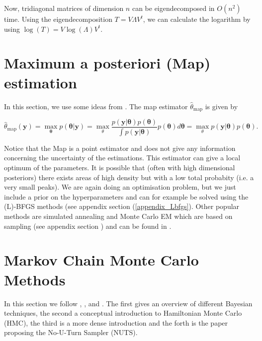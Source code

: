 \documentclass[12pt,a4paper,oneside]{book}
\begin{document}
Now, tridiagonal matrices of dimension $n$ can be eigendecomposed in $O(n^2)$ time. Using the eigendecomposition $T = V \Lambda V^{t}$, we can calculate the logarithm by using $\log (T) = V \log {(\Lambda)}V^{t}$.  




\section{Maximum a posteriori (Map) estimation} \label{Appendix_map}

In this section, we use some ideas from \cite{andrieu2003introduction}. The map estimator $\hat{\theta}_{\text{map}}$ is given by

\begin{equation}
\hat{\theta}_{\text{map}}(\bm{y}) = \max\limits_{\bm{\theta}} p(\bm{\theta} | \bm{y} ) = \max\limits_{\theta}  \dfrac{p(\bm{y}| \bm{\theta}) p(\bm{\theta})}{ \int p(\bm{y}| \bm{\theta})} p(\bm{\theta}) d\bm{\theta} = \max\limits_{\theta} p(\bm{y}| \bm{\theta}) p(\bm{\theta}).
\end{equation}

Notice that the Map is a point estimator and does not give any information concerning the uncertainty of the estimations. This estimator can give a local optimum of the parameters. It is possible that (often with high dimensional posteriors) there exists areas of high density but with a low total probabity (i.e. a very small peaks). We are again doing  an optimisation problem, but we just include a prior on the hyperparameters and can for example be solved using the (L)-BFGS methods (see appendix section (\ref{appendix_Lbfgs}). Other popular methods are simulated annealing and Monte Carlo EM which are based on sampling (see appendix section \label{appendix_mcmc}) and can be found in \cite{andrieu2003introduction}. 


\section{Markov Chain Monte Carlo Methods} \label{appendix_mcmc}

In this section we follow \cite{andrieu2003introduction}, \cite{betancourt2017conceptual}, \cite{fichtner2018tutorial} and \cite{hoffman2014no}. The first gives an overview of different Bayesian techniques, the second a conceptual introduction to Hamiltonian Monte Carlo (HMC), the third is a more dense introduction and the forth is the paper proposing the No-U-Turn Sampler (NUTS). 
\end{document}
